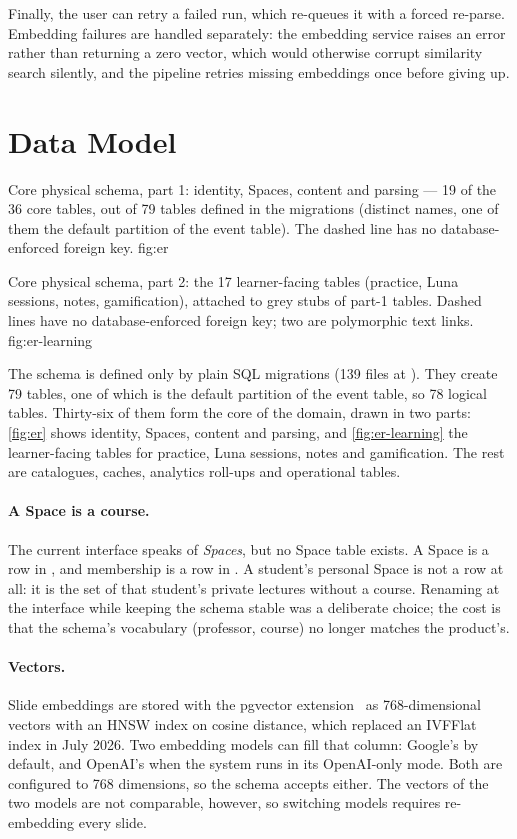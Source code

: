 Finally, the user can retry a failed run, which re-queues it with a forced
re-parse. Embedding failures are handled separately: the embedding service
raises an error rather than returning a zero vector, which would otherwise
corrupt similarity search silently, and the pipeline retries missing embeddings
once before giving up.

\section{Data Model}
\label{sec:data-model}

  {Core physical schema, part 1: identity, Spaces, content and parsing --- 19 of
   the 36 core tables, out of 79 tables defined in the migrations (distinct
    names, one of them the default partition of the event
   table). The dashed line has no
   database-enforced foreign key.}
  {fig:er}

  {Core physical schema, part 2: the 17 learner-facing tables (practice, Luna
   sessions, notes, gamification), attached to grey stubs of part-1 tables.
   Dashed lines have no database-enforced foreign key; two are polymorphic
    text links.}
  {fig:er-learning}

The schema is defined only by plain SQL migrations (139 files at
\code{\thesisCommit}). They create 79 tables, one of which is the default partition
of the event table, so 78 logical tables. Thirty-six of them form the core of
the domain, drawn in two parts: \cref{fig:er} shows identity, Spaces, content and
parsing, and \cref{fig:er-learning} the learner-facing tables for practice, Luna
sessions, notes and gamification. The rest are catalogues, caches, analytics
roll-ups and operational tables.

\paragraph{A Space is a course.}
The current interface speaks of \emph{Spaces}, but no Space table exists. A
Space is a row in , and membership is a row in
. A student's personal Space is not a row at all: it is
the set of that student's private lectures without a course. Renaming at the
interface while keeping the schema stable was a deliberate choice; the cost is
that the schema's vocabulary (professor, course) no longer matches the
product's.

\paragraph{Vectors.}
Slide embeddings are stored with the pgvector extension~\cite{pgvector} as
768-dimensional vectors with an HNSW index on cosine distance, which replaced an
IVFFlat index in July 2026. Two embedding models can fill that column: Google's
 by default, and OpenAI's
 when the system runs in its OpenAI-only mode. Both
are configured to 768 dimensions, so the schema accepts either. The vectors of
the two models are not comparable, however, so switching models requires
re-embedding every slide.

